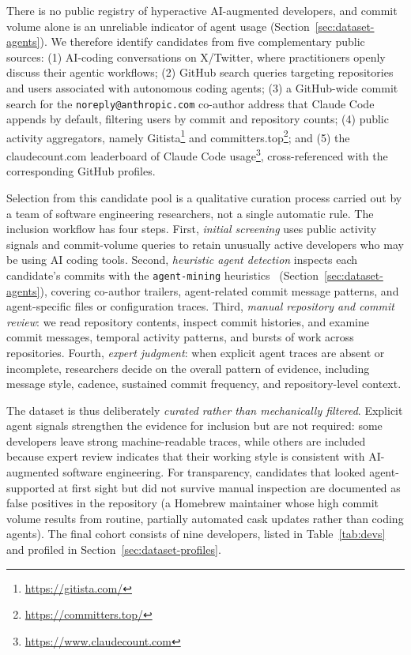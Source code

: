 \documentclass[smallextended]{svjour3}
\begin{document}
There is no public registry of hyperactive AI-augmented developers, and commit volume alone is an unreliable indicator of agent usage (Section~\ref{sec:dataset-agents}).
We therefore identify candidates from five complementary public sources: (1) AI-coding conversations on X/Twitter, where practitioners openly discuss their agentic workflows; (2) GitHub search queries targeting repositories and users associated with autonomous coding agents;
(3) a GitHub-wide commit search for the \texttt{noreply@anthropic.com} co-author address that Claude Code appends by default, filtering users by commit and repository counts;
(4) public activity aggregators, namely Gitista\footnote{\url{https://gitista.com/}} and committers.top\footnote{\url{https://committers.top/}}; and (5) the claudecount.com leaderboard of Claude Code usage\footnote{\url{https://www.claudecount.com}}, cross-referenced with the corresponding GitHub profiles.

Selection from this candidate pool is a qualitative curation process carried out by a team of software engineering researchers, not a single automatic rule.
The inclusion workflow has four steps.
First, \emph{initial screening} uses public activity signals and commit-volume queries to retain unusually active developers who may be using AI coding tools.
Second, \emph{heuristic agent detection} inspects each candidate's commits with the \texttt{agent-mining} heuristics~\cite{Robbes2026} (Section~\ref{sec:dataset-agents}), covering co-author trailers, agent-related commit message patterns, and agent-specific files or configuration traces.
Third, \emph{manual repository and commit review}: we read repository contents, inspect commit histories, and examine commit messages, temporal activity patterns, and bursts of work across repositories.
Fourth, \emph{expert judgment}: when explicit agent traces are absent or incomplete, researchers decide on the overall pattern of evidence, including message style, cadence, sustained commit frequency, and repository-level context.

The dataset is thus deliberately \emph{curated rather than mechanically filtered}.
Explicit agent signals strengthen the evidence for inclusion but are not required: some developers leave strong machine-readable traces, while others are included because expert review indicates that their working style is consistent with AI-augmented software engineering.
For transparency, candidates that looked agent-supported at first sight but did not survive manual inspection are documented as false positives in the repository (\eg a Homebrew maintainer whose high commit volume results from routine, partially automated cask updates rather than coding agents).
The final cohort consists of nine developers, listed in Table~\ref{tab:devs} and profiled in Section~\ref{sec:dataset-profiles}.
\end{document}
